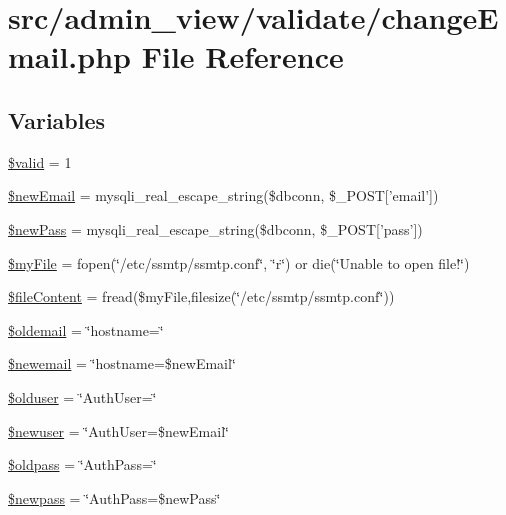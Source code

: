 \hypertarget{changeEmail_8php}{\section{src/admin\-\_\-view/validate/change\-Email.php \-File \-Reference}
\label{changeEmail_8php}
}
\subsection*{\-Variables}
\begin{DoxyCompactItemize}
\item 
\hyperlink{changeEmail_8php_a0587674d27d00ef497e08e53ccf45bbb}{\$valid} = 1
\item 
\hyperlink{changeEmail_8php_ab8dfe1defb9b0561a165b59f387dfebd}{\$new\-Email} = mysqli\-\_\-real\-\_\-escape\-\_\-string(\$dbconn, \$\-\_\-\-P\-O\-S\-T\mbox{[}'email'\mbox{]})
\item 
\hyperlink{changeEmail_8php_a37ca0c79236601207fcf80e029b8a573}{\$new\-Pass} = mysqli\-\_\-real\-\_\-escape\-\_\-string(\$dbconn, \$\-\_\-\-P\-O\-S\-T\mbox{[}'pass'\mbox{]})
\item 
\hyperlink{changeEmail_8php_aec8c77a99462294dbbfb1639bd8b5165}{\$my\-File} = fopen(\char`\"{}/etc/ssmtp/ssmtp.\-conf\char`\"{}, \char`\"{}r\char`\"{}) or die(\char`\"{}\-Unable to open file!\char`\"{})
\item 
\hyperlink{changeEmail_8php_ad89080bb6e501b4f254f01ee5d24fa2d}{\$file\-Content} = fread(\$my\-File,filesize(\char`\"{}/etc/ssmtp/ssmtp.\-conf\char`\"{}))
\item 
\hyperlink{changeEmail_8php_a4bc4c985021f839a471d37cee4cd84d3}{\$oldemail} = \char`\"{}hostname=\char`\"{}
\item 
\hyperlink{changeEmail_8php_a9ca73f95fb990256fbfb6c68f5a7737b}{\$newemail} = \char`\"{}hostname=\$new\-Email\char`\"{}
\item 
\hyperlink{changeEmail_8php_ad37dae854d7ab1ccf30e1bc5e5fc8834}{\$olduser} = \char`\"{}\-Auth\-User=\char`\"{}
\item 
\hyperlink{changeEmail_8php_a1133c11f7ee0057b9f6879abb058f87d}{\$newuser} = \char`\"{}\-Auth\-User=\$new\-Email\char`\"{}
\item 
\hyperlink{changeEmail_8php_ac91d50aede6cea362c8a10db1ab9a916}{\$oldpass} = \char`\"{}\-Auth\-Pass=\char`\"{}
\item 
\hyperlink{changeEmail_8php_af05fd45196336008a55cceff7365760f}{\$newpass} = \char`\"{}\-Auth\-Pass=\$new\-Pass\char`\"{}

\end{DoxyCompactItemize}
